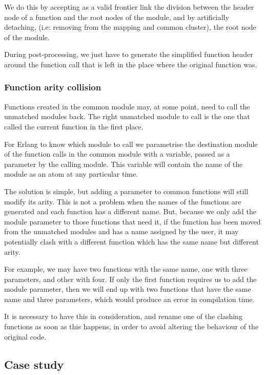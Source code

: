 We do this by accepting as a valid frontier link the division between the
header node of a function and the root nodes of the module, and by artificially
detaching, (i.e: removing from the mapping and common cluster), the
root node of the module.

During post-processing, we just have to generate the simplified function
header around the function call that is left in the place where the
original function was.


\subsubsection{Function arity collision\label{sub:function-arity-collision}}

Functions created in the common module may, at some point, need to
call the unmatched modules back. The right unmatched module to call
is the one that called the current function in the first place.

For Erlang to know which module to call we parametrise the destination
module of the function calls in the common module with a variable,
passed as a parameter by the calling module. This variable will contain
the name of the module as an atom at any particular time.

The solution is simple, but adding a parameter to common functions
will still modify its arity. This is not a problem when the names
of the functions are generated and each function has a different name.
But, because we only add the module parameter to those functions that
need it, if the function has been moved from the unmatched 
modules and has a name assigned by the user, it may potentially clash
with a different function which has the same name but different arity.

For example, we may have two functions with the same name, one with
three parameters, and other with four. If only the first function
requires us to add the module parameter, then we will end up with two
functions that have the same name and three parameters, which would
produce an error in compilation time.

It is necessary to have this in consideration, and rename one of the
clashing functions as soon as this happens, in order to avoid altering
the behaviour of the original code.

\subsection{Case study}
\label{sec:case-study}

